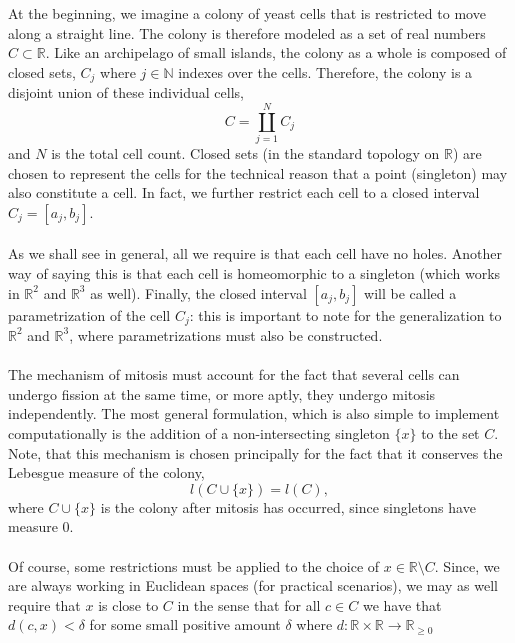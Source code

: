 At the beginning, we imagine a colony of yeast cells that is restricted to move 
along a straight line. The colony is therefore modeled as a set of real numbers 
$C \subset \mathbb{R}$. Like an archipelago of small islands, the colony as a whole 
is composed of closed sets, $C_j$ where $j \in \mathbb{N}$ indexes over the cells. 
Therefore, the colony is a disjoint union of these individual cells,
\begin{equation*}
    C = \coprod_{j=1}^N C_j
\end{equation*}
and $N$ is the total cell count. Closed sets (in the standard topology on 
$\mathbb{R}$) are chosen to represent the cells for the technical reason that 
a point (singleton) may also constitute a cell. In fact, we further restrict 
each cell to a closed interval $C_j = [a_j, b_j]$.
\\
\\
As we shall see in general, all we require is that each cell have no holes. 
Another way of saying this is that each cell is homeomorphic to a singleton 
(which works in $\mathbb{R}^2$ and $\mathbb{R}^3$ as well). Finally, the closed 
interval $[a_j,b_j]$ will be called a parametrization of the cell $C_j$: this is 
important to note for the generalization to $\mathbb{R}^2$ and $\mathbb{R}^3$, 
where parametrizations must also be constructed.
\\
\\
The mechanism of mitosis must account for the fact that several cells can 
undergo fission at the same time, or more aptly, they undergo mitosis independently. 
The most general formulation, which is also simple to implement computationally is the 
addition of a non-intersecting singleton $\{x  \}$ to the set $C$. Note, that this 
mechanism is chosen principally for the fact that it conserves the Lebesgue measure of the colony,
\begin{equation*}
    l(C \cup \{x\} ) = l(C),
\end{equation*}
where $C \cup \{x\} $ is the colony after mitosis has occurred, since singletons have measure $0$. 
\\
\\
Of course, some restrictions must be applied to the choice of 
$x \in \mathbb{R} \setminus C$. Since, we are always working in 
Euclidean spaces (for practical scenarios), we may as well require that 
$x$ is close to $C$ in the sense that for all $c \in C$ we have that 
$d(c,x) < \delta$ for some small positive amount $\delta$ where 
$d: \mathbb{R} \times \mathbb{R} \rightarrow \mathbb{R}_{\geq 0}$ 
